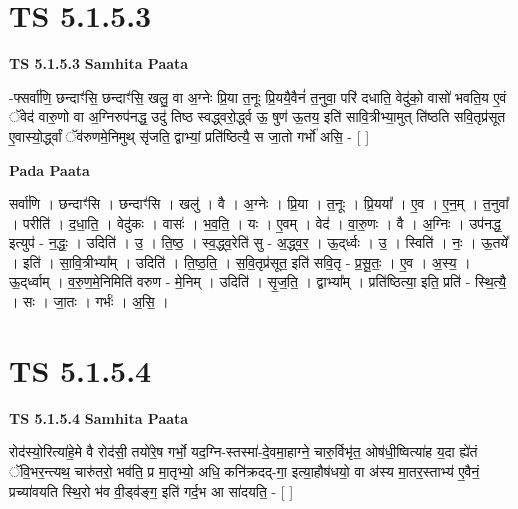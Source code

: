 \documentclass[17pt]{extarticle}
\begin{document}
\section*{ TS 5.1.5.3 }

\textbf{TS 5.1.5.3 } \newline
\textbf{Samhita Paata} \newline

-फ्सर्वा॑णि॒ छन्दाꣳ॑सि॒ छन्दाꣳ॑सि॒ खलु॒ वा अ॒ग्नेः प्रि॒या त॒नूः प्रि॒ययै॒वैनं॑ त॒नुवा॒ परि॑ दधाति॒ वेदु॑को॒ वासो॑ भवति॒य ए॒वं ॅवेद॑ वारु॒णो वा अ॒ग्निरुप॑नद्ध॒ उदु॑ तिष्ठ स्वद्ध्वरो॒र्द्ध्व ऊ॒ षुण॑ ऊ॒तय॒ इति॑ सावि॒त्रीभ्या॒मुत् ति॑ष्ठति सवि॒तृप्र॑सूत ए॒वास्यो॒र्द्ध्वां ॅव॑रुणमे॒निमुथ् सृ॑जति॒ द्वाभ्यां॒ प्रति॑ष्ठित्यै॒ स जा॒तो गर्भो॑ असि॒ - [  ] \newline

\textbf{Pada Paata} \newline

सर्वा॑णि । छन्दाꣳ॑सि । छन्दाꣳ॑सि । खलु॑ । वै । अ॒ग्नेः । प्रि॒या । त॒नूः । प्रि॒यया᳚ । ए॒व । ए॒न॒म् । त॒नुवा᳚ । परीति॑ । द॒धा॒ति॒ । वेदु॑कः । वासः॑ । भ॒व॒ति॒ । यः । ए॒वम् । वेद॑ । वा॒रु॒णः । वै । अ॒ग्निः । उप॑नद्ध॒ इत्युप॑ - न॒द्धः॒ । उदिति॑ । उ॒ । ति॒ष्ठ॒ । स्व॒द्ध्व॒रेति॑ सु - अ॒द्ध्व॒र॒ । ऊ॒द्‌र्ध्वः । उ॒ । स्विति॑ । नः॒ । ऊ॒तये᳚ । इति॑ । सा॒वि॒त्रीभ्या᳚म् । उदिति॑ । ति॒ष्ठ॒ति॒ । स॒वि॒तृप्र॑सूत॒ इति॑ सवि॒तृ - प्र॒सू॒तः॒ । ए॒व । अ॒स्य॒ । ऊ॒द्‌र्ध्वाम् । व॒रु॒ण॒मे॒निमिति॑ वरुण - मे॒निम् । उदिति॑ । सृ॒ज॒ति॒ । द्वाभ्या᳚म् । प्रति॑ष्ठित्या॒ इति॒ प्रति॑ - स्थि॒त्यै॒ । सः । जा॒तः । गर्भः॑ । अ॒सि॒ ।  \newline




\section*{ TS 5.1.5.4 }

\textbf{TS 5.1.5.4 } \newline
\textbf{Samhita Paata} \newline

रोद॑स्यो॒रित्या॑हे॒मे वै रोद॑सी॒ तयो॑रे॒ष गर्भो॒ यद॒ग्नि-स्तस्मा॑-दे॒वमा॒हाग्ने॒ चारु॒र्विभृ॑त॒ ओष॑धी॒ष्वित्या॑ह य॒दा ह्ये॑तं ॅवि॒भर॒न्त्यथ॒ चारु॑तरो॒ भव॑ति॒ प्र मा॒तृभ्यो॒ अधि॒ कनि॑क्रदद्-गा॒ इत्या॒हौष॑धयो॒ वा अ॑स्य मा॒तर॒स्ताभ्य॑ ए॒वैनं॒ प्रच्या॑वयति स्थि॒रो भ॑व वी॒ड्व॑ङ्ग॒ इति॑ गर्द॒भ आ सा॑दयति॒ - [  ] \newline
\end{document}
